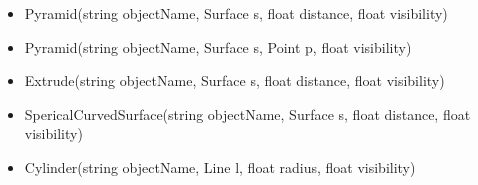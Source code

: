 \begin{itemize}
\item Pyramid(string objectName, Surface s, float distance, float visibility) 

\item Pyramid(string objectName, Surface s, Point p, float visibility) 

\item Extrude(string objectName, Surface s, float distance, float visibility) 

\item SpericalCurvedSurface(string objectName, Surface s, float distance, float visibility)


\item Cylinder(string objectName, Line l, float radius, float visibility)
\end{itemize}
